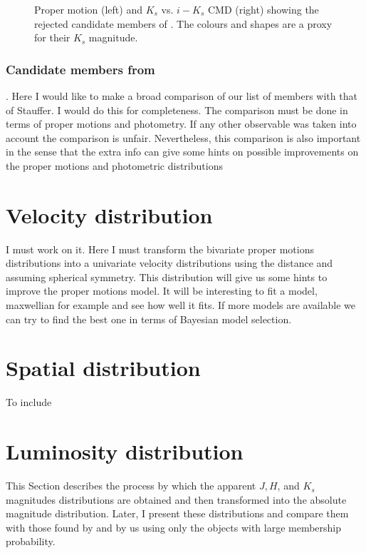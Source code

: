 \begin{figure*}[htbp]
\begin{center}
\caption{Proper motion (left) and $K_s$ vs. $i-K_s$ CMD (right) showing the rejected candidate members of \citet{Bouy2015}. The colours and shapes are a proxy for their $K_s$ magnitude.}
\label{figure:rejectedsCOLORS}
\end{center}
\end{figure*}
\subsubsection{Candidate members from \citet{Stauffer2007}}.
Here I would like to make a broad comparison of our list of members with that of Stauffer. I would do this for completeness.
The comparison must be done in terms of proper motions and photometry. If any other observable was taken into account the comparison is unfair. Nevertheless, this comparison is also important in the sense that the extra info can give some hints on possible improvements on the proper motions and photometric distributions
\section{Velocity distribution}
I must work on it. Here I must transform the bivariate proper motions distributions into a univariate velocity distributions using the distance and assuming spherical symmetry. This distribution will give us some hints to improve the proper motions model. It will be interesting to fit a model, maxwellian for example and see how well it fits. If more models are available we can try to find the best one in terms of Bayesian model selection. 
\section{Spatial distribution}
To include
\section{Luminosity distribution}
This Section describes the process by which the apparent $J,H$, and $K_s$ magnitudes distributions are obtained and then transformed into the absolute magnitude distribution. Later, I present  these distributions and compare them with those found by \citet{Bouy2015} and by us using only the objects with large membership probability. 

